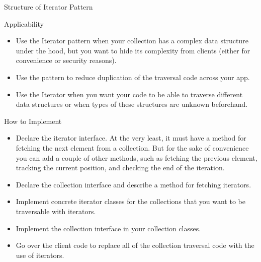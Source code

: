 \documentclass[13pt]{beamer}
\begin{document}
\begin{frame}{Structure of Iterator Pattern}
	\begin{center}
	\end{center}
\end{frame}

\begin{frame}{Applicability}
	\begin{itemize}
		\item Use the Iterator pattern when your collection has a complex data structure under the hood, but you want to hide its complexity from clients (either for convenience or security reasons).
		\item Use the pattern to reduce duplication of the traversal code across your app.
		\item Use the Iterator when you want your code to be able to traverse different data structures or when types of these structures are unknown beforehand.
	\end{itemize}
\end{frame}

\begin{frame}{How to Implement}
	\begin{itemize}
		\item Declare the iterator interface. At the very least, it must have a method for fetching the next element from a collection. But for the sake of convenience you can add a couple of other methods, such as fetching the previous element, tracking the current position, and checking the end of the iteration.
		\item Declare the collection interface and describe a method for fetching iterators.
		\item Implement concrete iterator classes for the collections that you want to be traversable with iterators.
		\item Implement the collection interface in your collection classes. 
		\item Go over the client code to replace all of the collection traversal code with the use of iterators.
	\end{itemize}
\end{frame}
\end{document}
